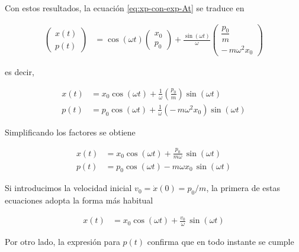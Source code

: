 \documentclass{article}
\begin{document}
Con estos resultados, la ecuación \eqref{eq:xp-con-exp-At} se traduce en

\begin{equation}
\begin{split}
\begin{pmatrix}
x(t) \\[4pt]
p(t)
\end{pmatrix}
&=
\cos(\omega t)
\begin{pmatrix}
x_{0} \\[4pt]
p_{0}
\end{pmatrix}
+
\frac{\sin(\omega t)}{\omega}
\begin{pmatrix}
\dfrac{p_{0}}{m} \\[6pt]
-\,m\omega^{2}x_{0}
\end{pmatrix}
\end{split}
\end{equation}

es decir,

\begin{equation}
\begin{split}
x(t)
&= x_{0}\cos(\omega t)
   + \frac{1}{\omega}\left(\frac{p_{0}}{m}\right)\sin(\omega t) \\[4pt]
p(t)
&= p_{0}\cos(\omega t)
   + \frac{1}{\omega}\left(-\,m\omega^{2}x_{0}\right)\sin(\omega t)
\end{split}
\label{eq:xp-soluciones-matriciales}
\end{equation}

Simplificando los factores se obtiene

\begin{equation}
\begin{split}
x(t)
&= x_{0}\cos(\omega t)
   + \frac{p_{0}}{m\omega}\,\sin(\omega t) \\[4pt]
p(t)
&= p_{0}\cos(\omega t)
   - m\omega x_{0}\,\sin(\omega t)
\end{split}
\end{equation}

Si introducimos la velocidad inicial $v_{0} = \dot{x}(0) = p_{0}/m$, la primera
de estas ecuaciones adopta la forma más habitual

\begin{equation}
\begin{split}
x(t)
&= x_{0}\cos(\omega t)
   + \frac{v_{0}}{\omega}\,\sin(\omega t)
\end{split}
\label{eq:x-solucion-matriz}
\end{equation}

Por otro lado, la expresión para $p(t)$ confirma que en todo instante se cumple
\end{document}
